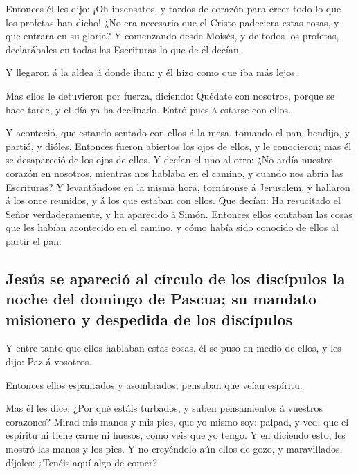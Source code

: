  Entonces él les dijo: ¡Oh insensatos, y tardos de
corazón para creer todo lo que los profetas han dicho! 
¿No era necesario que el Cristo padeciera estas cosas, y que entrara en
su gloria?  Y comenzando desde Moisés, y de todos los
profetas, declarábales en todas las Escrituras lo que de él decían.

 Y llegaron á la aldea á donde iban: y él hizo como que
iba más lejos.

 Mas ellos le detuvieron por fuerza, diciendo: Quédate
con nosotros, porque se hace tarde, y el día ya ha declinado. Entró pues
á estarse con ellos.

 Y aconteció, que estando sentado con ellos á la mesa,
tomando el pan, bendijo, y partió, y dióles.  Entonces
fueron abiertos los ojos de ellos, y le conocieron; mas él se
desapareció de los ojos de ellos.  Y decían el uno al
otro: ¿No ardía nuestro corazón en nosotros, mientras nos hablaba en el
camino, y cuando nos abría las Escrituras?  Y
levantándose en la misma hora, tornáronse á Jerusalem, y hallaron á los
once reunidos, y á los que estaban con ellos.  Que
decían: Ha resucitado el Señor verdaderamente, y ha aparecido á Simón.
 Entonces ellos contaban las cosas que les habían
acontecido en el camino, y cómo había sido conocido de ellos al partir
el pan.

\hypertarget{jesuxfas-se-apareciuxf3-al-cuxedrculo-de-los-discuxedpulos-la-noche-del-domingo-de-pascua-su-mandato-misionero-y-despedida-de-los-discuxedpulos}{%
\subsection{Jesús se apareció al círculo de los discípulos la noche del
domingo de Pascua; su mandato misionero y despedida de los
discípulos}\label{jesuxfas-se-apareciuxf3-al-cuxedrculo-de-los-discuxedpulos-la-noche-del-domingo-de-pascua-su-mandato-misionero-y-despedida-de-los-discuxedpulos}}

 Y entre tanto que ellos hablaban estas cosas, él se puso
en medio de ellos, y les dijo: Paz á vosotros.

 Entonces ellos espantados y asombrados, pensaban que
veían espíritu.

 Mas él les dice: ¿Por qué estáis turbados, y suben
pensamientos á vuestros corazones?  Mirad mis manos y mis
pies, que yo mismo soy: palpad, y ved; que el espíritu ni tiene carne ni
huesos, como veis que yo tengo.  Y en diciendo esto, les
mostró las manos y los pies.  Y no creyéndolo aún ellos
de gozo, y maravillados, díjoles: ¿Tenéis aquí algo de comer?

